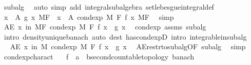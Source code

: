 \begin{isabellebody}
\ subalg\ \isamarkupfalse%
\ {\isacharparenleft}{\kern0pt}auto\ simp\ add{\isacharcolon}{\kern0pt}\ integral{\isacharunderscore}{\kern0pt}subalgebra{}\ set{\isacharunderscore}{\kern0pt}lebesgue{\isacharunderscore}{\kern0pt}integral{\isacharunderscore}{\kern0pt}def{\isacharparenright}{\kern0pt}\isanewline
\ \ \ \ \isamarkupfalse%
\ \isamarkupfalse%
\ {\isachardoublequoteopen}{\isacharparenleft}{\kern0pt}{\isasymintegral}x\ {\isasymin}\ A{\isachardot}{\kern0pt}\ g\ x\ {\isasympartial}{\isacharquery}{\kern0pt}MF{\isacharparenright}{\kern0pt}\ {\isacharequal}{\kern0pt}\ {\isacharparenleft}{\kern0pt}{\isasymintegral}x\ {\isasymin}\ A{\isachardot}{\kern0pt}\ cond{\isacharunderscore}{\kern0pt}exp\ M\ F\ f\ x\ {\isasympartial}{\isacharquery}{\kern0pt}MF{\isacharparenright}{\kern0pt}{\isachardoublequoteclose}\ \isamarkupfalse%
\ simp\isanewline
\ \ \isacommand{{\isacharbraceright}{\kern0pt}}\isamarkupfalse%
\isanewline
\ \ \isamarkupfalse%
\ {\isachardoublequoteopen}AE\ x\ in\ {\isacharquery}{\kern0pt}MF{\isachardot}{\kern0pt}\ cond{\isacharunderscore}{\kern0pt}exp\ M\ F\ f\ x\ {\isacharequal}{\kern0pt}\ g\ x{\isachardoublequoteclose}\ \isamarkupfalse%
\ cond{\isacharunderscore}{\kern0pt}exp\ assms\ subalg\ \isamarkupfalse%
\ {\isacharparenleft}{\kern0pt}intro\ density{\isacharunderscore}{\kern0pt}unique{\isacharunderscore}{\kern0pt}banach{\isacharcomma}{\kern0pt}\ auto\ dest{\isacharcolon}{\kern0pt}\ has{\isacharunderscore}{\kern0pt}cond{\isacharunderscore}{\kern0pt}expD\ intro{\isacharbang}{\kern0pt}{\isacharcolon}{\kern0pt}\ integrable{\isacharunderscore}{\kern0pt}in{\isacharunderscore}{\kern0pt}subalg{\isacharparenright}{\kern0pt}\isanewline
\ \ \isamarkupfalse%
\ \isamarkupfalse%
\ {\isachardoublequoteopen}AE\ x\ in\ M{\isachardot}{\kern0pt}\ cond{\isacharunderscore}{\kern0pt}exp\ M\ F\ f\ x\ {\isacharequal}{\kern0pt}\ g\ x{\isachardoublequoteclose}\ \isamarkupfalse%
\ AE{\isacharunderscore}{\kern0pt}restr{\isacharunderscore}{\kern0pt}to{\isacharunderscore}{\kern0pt}subalg{\isacharbrackleft}{\kern0pt}OF\ subalg{\isacharbrackright}{\kern0pt}\ \isamarkupfalse%
\ simp\isanewline
{}\isamarkupfalse%
%
\endisatagproof
{\isafoldproof}%
%
\isadelimproof
\isanewline
%
\endisadelimproof
\isanewline
{}\isamarkupfalse%
\ cond{\isacharunderscore}{\kern0pt}exp{\isacharunderscore}{\kern0pt}charact{\isacharcolon}{\kern0pt}\isanewline
\ \ \ f\ {\isacharcolon}{\kern0pt}{\isacharcolon}{\kern0pt}\ {\isachardoublequoteopen}{\isacharprime}{\kern0pt}a\ {\isasymRightarrow}\ {\isacharprime}{\kern0pt}b{\isacharcolon}{\kern0pt}{\isacharcolon}{\kern0pt}{\isacharbraceleft}{\kern0pt}second{\isacharunderscore}{\kern0pt}countable{\isacharunderscore}{\kern0pt}topology{\isacharcomma}{\kern0pt}\ banach{\isacharbraceright}{\kern0pt}{\isachardoublequoteclose}\isanewline

\end{isabellebody}
